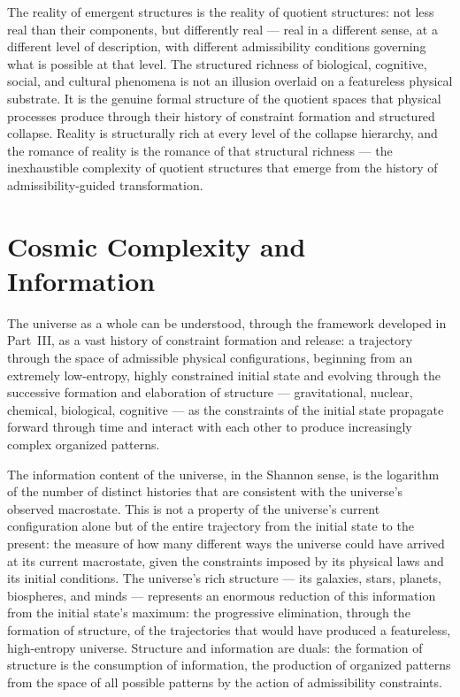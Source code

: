 \documentclass[12pt,openany]{book}
\theoremstyle{plain}
\theoremstyle{definition}
\theoremstyle{remark}
\begin{document}
The reality of emergent structures is the reality of quotient structures: not less real than their components, but differently real — real in a different sense, at a different level of description, with different admissibility conditions governing what is possible at that level. The structured richness of biological, cognitive, social, and cultural phenomena is not an illusion overlaid on a featureless physical substrate. It is the genuine formal structure of the quotient spaces that physical processes produce through their history of constraint formation and structured collapse. Reality is structurally rich at every level of the collapse hierarchy, and the romance of reality is the romance of that structural richness — the inexhaustible complexity of quotient structures that emerge from the history of admissibility-guided transformation.

\section{Cosmic Complexity and Information}

The universe as a whole can be understood, through the framework developed in Part~III, as a vast history of constraint formation and release: a trajectory through the space of admissible physical configurations, beginning from an extremely low-entropy, highly constrained initial state and evolving through the successive formation and elaboration of structure — gravitational, nuclear, chemical, biological, cognitive — as the constraints of the initial state propagate forward through time and interact with each other to produce increasingly complex organized patterns.

The information content of the universe, in the Shannon sense, is the logarithm of the number of distinct histories that are consistent with the universe's observed macrostate. This is not a property of the universe's current configuration alone but of the entire trajectory from the initial state to the present: the measure of how many different ways the universe could have arrived at its current macrostate, given the constraints imposed by its physical laws and its initial conditions. The universe's rich structure — its galaxies, stars, planets, biospheres, and minds — represents an enormous reduction of this information from the initial state's maximum: the progressive elimination, through the formation of structure, of the trajectories that would have produced a featureless, high-entropy universe. Structure and information are duals: the formation of structure is the consumption of information, the production of organized patterns from the space of all possible patterns by the action of admissibility constraints.
\end{document}
